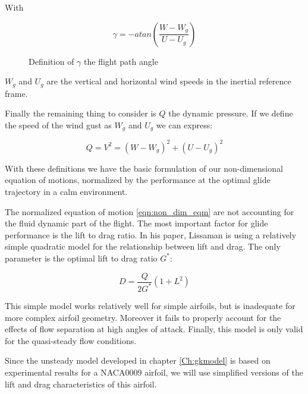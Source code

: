 With 

\begin{equation}
\gamma = -atan(\frac{W-W_g}{U-U_g})
\label{eqn:gamma_def}
\end{equation}

\begin{figure}[h]
  \centering
  \caption{Definition of $\gamma$ the flight path angle}
  \label{fig:gamma}
\end{figure}


$W_g$ and $U_g$ are the vertical and horizontal wind speeds in the inertial reference frame.

\par Finally the remaining thing to consider is $Q$ the dynamic pressure. If we define the speed of the wind gust as $W_g$ and $U_g$ we can express:

\begin{equation}
Q = V^2 = (W-W_g)^2 + (U-U_g)^2
\label{eqn:q_def}
\end{equation}

\par With these definitions we have the basic formulation of our non-dimensional equation of motions, normalized by the performance at the optimal glide trajectory in a calm environment.

The normalized equation of motion \ref{eqn:non_dim_eqm} are not accounting for the fluid dynamic part of the flight.
The most important factor for glide performance is the lift to drag ratio. 
In his paper, Lissaman \cite{Lissaman2007neutral} is using a relatively simple quadratic model for the relationship between lift and drag.
The only parameter is the optimal lift to drag ratio $G^*$:

\begin{equation}
D=\frac{Q}{2G^*}(1+L^2)
\label{eqn:Lissaman_G}
\end{equation}


\par This simple model works relatively well for simple airfoils, but is inadequate for more complex airfoil geometry.
Moreover it fails to properly account for the effects of flow separation at high angles of attack.
Finally, this model is only valid for the quasi-steady flow conditions.

\par Since the unsteady model developed in chapter \ref{Ch:gkmodel} is based on experimental results for a NACA0009 airfoil, we will use simplified versions of the lift and drag characteristics of this airfoil.

